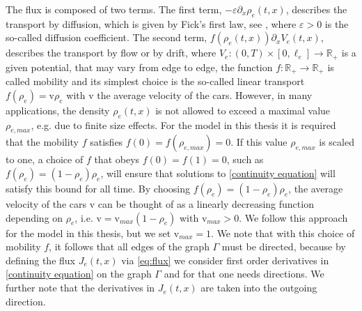 The flux is composed of two terms. The first term, $- \varepsilon \partial_x \rho_e  \left( t, x \right) $, describes the transport by diffusion, which is given by Fick's first law, see \cite{Fick:1855}, where $\varepsilon > 0$ is the so-called diffusion coefficient. The second term, $f \left( \rho_e \left( t, x \right)  \right)  \partial_x V_e \left( t, x \right) $, describes the transport by flow or by drift, where $V_e \colon  \left( 0,T \right)  \times \left[ 0, \ell_e \right] \to \mathbb{R}_{+}$ is a given potential, that may vary from edge to edge, the function $f \colon \mathbb{R}_{+} \to \mathbb{R}_{+}$ is called mobility and its simplest choice is the so-called linear transport $f \left( \rho_e \right)  = \mathrm{v} \rho_e$ with $\mathrm{v}$ the average velocity of the cars. However, in many applications, the density $\rho_e  \left( t,x \right) $ is not allowed to exceed a maximal value $\rho_{e, max}$, e.g. due to finite size effects. For the model in this thesis it is required that the mobility $f$ satisfies $f \left( 0 \right)  = f \left( \rho_{e, max} \right)  = 0$. If this value $\rho_{e, max}$ is scaled to one, a choice of $f$ that obeys $f \left( 0 \right)  = f \left( 1 \right)  = 0$, such as $f \left( \rho_e \right)  =  \left( 1-\rho_e \right)  \rho_e$, will ensure that solutions to \eqref{continuity equation} will satisfy this bound for all time. By choosing $f \left( \rho_e \right)  =  \left( 1-\rho_e \right)  \rho_e$, the average velocity of the cars $\mathrm{v}$ can be thought of as a linearly decreasing function depending on $\rho_e$, i.e. $\mathrm{v} = \mathrm{v}_{max}  \left( 1-\rho_e \right) $ with $\mathrm{v}_{max} > 0$. We follow this approach for the model in this thesis, but we set $\mathrm{v}_{max} = 1$. We note that with this choice of mobility $f$, it follows that all edges of the graph $\Gamma$ must be directed, because by defining the flux $J_e \left( t,x \right) $ via \cref{eq:flux} we consider first order derivatives in \cref{continuity equation} on the graph $\Gamma$ and for that one needs directions. We further note that the derivatives in $J_e \left( t,x \right) $ are taken into the outgoing direction. \\

